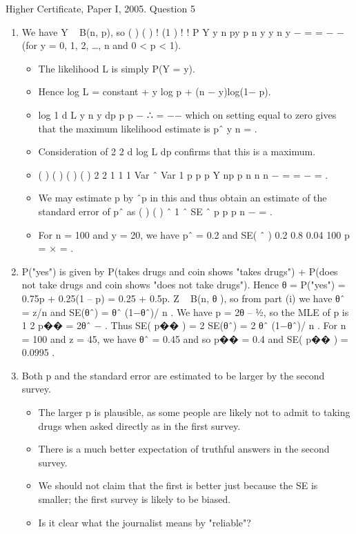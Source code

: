 \documentclass[a4paper,12pt]{article}
\begin{document}
Higher Certificate, Paper I, 2005. Question 5

\begin{enumerate}
\item We have Y ~ B(n, p), so ( ) ( ) ! (1 )
! !
P Y y n py p n y
y n y
− = = −
−
(for y = 0, 1, 2, …, n
and 0 < p < 1). 
\begin{itemize}
\item
The likelihood L is simply P(Y = y).
\item
Hence log L = constant + y log p + (n − y)log(1− p).
\item 
log
1
d L y n y
dp p p
− ∴ = −−
which on setting equal to zero gives that the maximum
likelihood estimate is pˆ y
n
= . 

\item Consideration of
2
2
d log L
dp
confirms that this is a
maximum.

\item 
( ) ( ) ( ) ( )
2 2
1 1 1 Var ˆ Var 1
p p
p Y np p
n n n
−
= = − = . 
\item We may estimate p by ˆp in this and
thus obtain an estimate of the standard error of pˆ as ( ) ( ) ˆ 1 ˆ
SE ˆ
p p
p
n
−
= .
\item 
For n = 100 and y = 20, we have pˆ = 0.2 and SE( ˆ ) 0.2 0.8 0.04
100
p = × = .
\end{itemize}
\item P("yes") is given by P(takes drugs and coin shows "takes drugs") + P(does not
take drugs and coin shows "does not take drugs").
Hence θ = P("yes") = 0.75p + 0.25(1 – p) = 0.25 + 0.5p.
Z ~ B(n, θ ), so from part (i) we have θˆ = z/n and SE(θˆ) = θˆ (1−θˆ)/ n .
We have p = 2θ – ½, so the MLE of p is 1
2
p�� = 2θˆ − .
Thus SE( p�� ) = 2 SE(θˆ) = 2 θˆ (1−θˆ)/ n .
For n = 100 and z = 45, we have θˆ = 0.45 and so p�� = 0.4 and SE( p�� ) = 0.0995 .
\item Both p and the standard error are estimated to be larger by the second survey.
\begin{itemize}
    \item The larger p is plausible, as some people are likely not to admit to taking drugs when
asked directly as in the first survey.
    \item There is a much better expectation of truthful
answers in the second survey.
    \item We should not claim that the first is better just because
the SE is smaller; the first survey is likely to be biased. 
    \item Is it clear what the journalist
means by "reliable"?
\end{itemize}

\end{enumerate}
\end{document}
